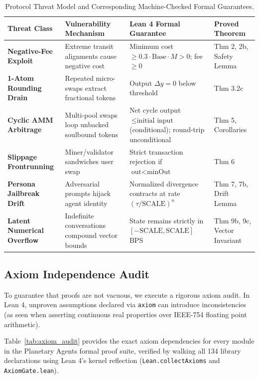 \documentclass[11pt,a4paper]{article}
\theoremstyle{plain}
\theoremstyle{definition}
\theoremstyle{remark}
\begin{document}
\begin{table}[htbp]
\centering
\small
\begin{tabular}{@{}llll@{}}
\toprule
\textbf{Threat Class} & \textbf{Vulnerability Mechanism} & \textbf{Lean 4 Formal Guarantee} & \textbf{Proved Theorem} \\ \midrule
\textbf{Negative-Fee Exploit} & Extreme transit alignments cause negative cost & Minimum cost $\ge 0.3 \cdot \text{Base} \cdot M > 0$; fee $\ge 0$ & Thm 2, 2b, Safety Lemma \\
\textbf{1-Atom Rounding Drain} & Repeated micro-swaps extract fractional tokens & Output $\Delta y = 0$ below threshold & Thm 3.2c \\
\textbf{Cyclic AMM Arbitrage} & Multi-pool swaps loop unbacked soulbound tokens & Net cycle output $\le \text{initial input}$ (conditional); round-trip unconditional & Thm 5, Corollaries \\
\textbf{Slippage Frontrunning} & Miner/validator sandwiches user swap & Strict transaction rejection if $\text{out} < \text{minOut}$ & Thm 6 \\
\textbf{Persona Jailbreak Drift} & Adversarial prompts hijack agent identity & Normalized divergence contracts at rate $(\tau/\text{SCALE})^n$ & Thm 7, 7b, Drift Lemma \\
\textbf{Latent Numerical Overflow} & Indefinite conversations compound vector bounds & State remains strictly in $[-\text{SCALE}, \text{SCALE}]$ BPS & Thm 9b, 9c, Vector Invariant \\
\bottomrule
\end{tabular}
\caption{Protocol Threat Model and Corresponding Machine-Checked Formal Guarantees.}
\label{tab:security_matrix}
\end{table}

\subsection{Axiom Independence Audit}

To guarantee that proofs are not vacuous, we execute a rigorous axiom audit. In Lean 4, unproven assumptions declared via \texttt{axiom} can introduce inconsistencies (as seen when asserting continuous real properties over IEEE-754 floating point arithmetic). 

Table~\ref{tab:axiom_audit} provides the exact axiom dependencies for every module in the Planetary Agents formal proof suite, verified by walking all 134 library declarations using Lean 4's kernel reflection (\texttt{Lean.collectAxioms} and \texttt{AxiomGate.lean}).
\end{document}
